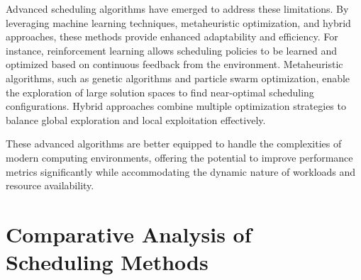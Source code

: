 \documentclass[a4paper, final]{article}
\begin{document}
Advanced scheduling algorithms have emerged to address these limitations. By leveraging machine learning techniques, 
metaheuristic optimization, and hybrid approaches, these methods provide enhanced adaptability and efficiency. 
For instance, reinforcement learning allows scheduling policies to be learned and optimized based on continuous feedback 
from the environment. Metaheuristic algorithms, such as genetic algorithms and particle swarm optimization, enable the 
exploration of large solution spaces to find near-optimal scheduling configurations. Hybrid approaches combine multiple optimization strategies to balance global exploration and local exploitation effectively.

These advanced algorithms are better equipped to handle the complexities of modern computing environments, offering the 
potential to improve performance metrics significantly while accommodating the dynamic nature of workloads and resource availability.


\section{Comparative Analysis of Scheduling Methods}
\end{document}
